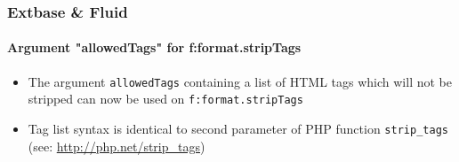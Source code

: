 
\begin{frame}[fragile]
	\frametitle{Extbase \& Fluid}
	\framesubtitle{Argument "allowedTags" for f:format.stripTags}

	\begin{itemize}

		\item The argument \texttt{allowedTags} containing a list of HTML tags
			which will not be stripped can now be used on \texttt{f:format.stripTags}

		\item Tag list syntax is identical to second parameter of PHP function
			\texttt{strip\_tags} (see: \url{http://php.net/strip_tags})

	\end{itemize}

\end{frame}


